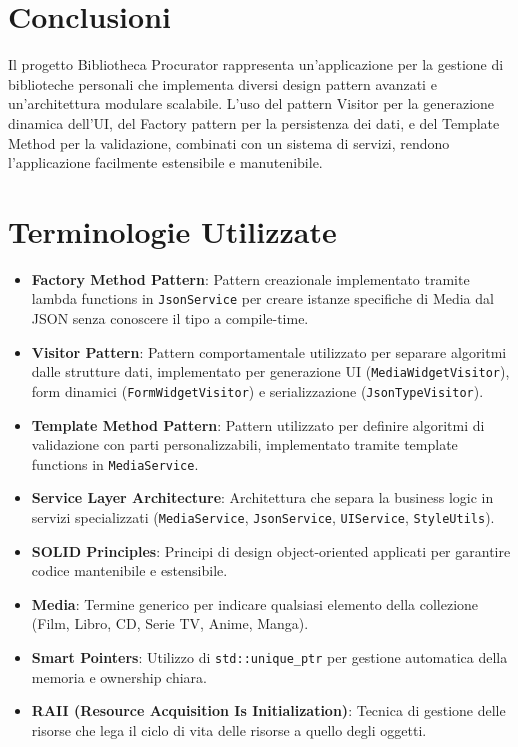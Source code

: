 \documentclass[a4paper,10pt]{article}
\begin{document}
\section{Conclusioni}
Il progetto Bibliotheca Procurator rappresenta un'applicazione per la gestione di biblioteche personali che implementa diversi design pattern avanzati e un'architettura modulare scalabile. L'uso del pattern Visitor per la generazione dinamica dell'UI, del Factory pattern per la persistenza dei dati, e del Template Method per la validazione, combinati con un sistema di servizi, rendono l'applicazione facilmente estensibile e manutenibile.

\section{Terminologie Utilizzate}
\begin{itemize}
    \item \textbf{Factory Method Pattern}: Pattern creazionale implementato tramite lambda functions in \texttt{JsonService} per creare istanze specifiche di Media dal JSON senza conoscere il tipo a compile-time.
    \item \textbf{Visitor Pattern}: Pattern comportamentale utilizzato per separare algoritmi dalle strutture dati, implementato per generazione UI (\texttt{MediaWidgetVisitor}), form dinamici (\texttt{FormWidgetVisitor}) e serializzazione (\texttt{JsonTypeVisitor}).
    \item \textbf{Template Method Pattern}: Pattern utilizzato per definire algoritmi di validazione con parti personalizzabili, implementato tramite template functions in \texttt{MediaService}.
    \item \textbf{Service Layer Architecture}: Architettura che separa la business logic in servizi specializzati (\texttt{MediaService}, \texttt{JsonService}, \texttt{UIService}, \texttt{StyleUtils}).
    \item \textbf{SOLID Principles}: Principi di design object-oriented applicati per garantire codice mantenibile e estensibile.
    \item \textbf{Media}: Termine generico per indicare qualsiasi elemento della collezione (Film, Libro, CD, Serie TV, Anime, Manga).
    \item \textbf{Smart Pointers}: Utilizzo di \texttt{std::unique\_ptr} per gestione automatica della memoria e ownership chiara.
    \item \textbf{RAII (Resource Acquisition Is Initialization)}: Tecnica di gestione delle risorse che lega il ciclo di vita delle risorse a quello degli oggetti.
\end{itemize}
\end{document}

